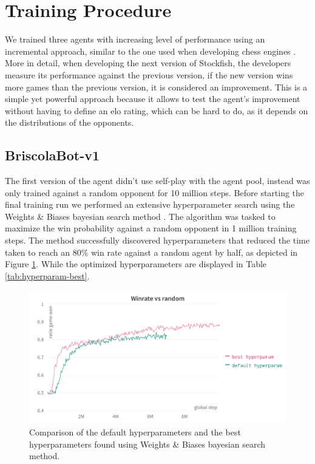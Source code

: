 \section{Training Procedure}
We trained three agents with increasing level of performance using an incremental approach, similar to the one used when developing chess engines \cite{stockfish,lc0}. More in detail, when developing the next version of Stockfish, the developers measure its performance against the previous version, if the new version wins more games than the previous version, it is considered an improvement. This is a simple yet powerful approach because it allows to test the agent's improvement without having to define an elo rating, which can be hard to do, as it depends on the distributions of the opponents.

\subsection{BriscolaBot-v1}
The first version of the agent didn't use self-play with the agent pool, instead was only trained against a random opponent for 10 million steps. Before starting the final training run we performed an extensive hyperparameter search using the Weights \& Biases bayesian search method \cite{wandb}. The algorithm was tasked to maximize the win probability against a random opponent in 1 million training steps. The method successfully discovered hyperparameters that reduced the time taken to reach an 80\% win rate against a random agent by half, as depicted in Figure \ref{fig:hyperparam-best-default}. While the optimized hyperparameters are displayed in Table \ref{tab:hyperparam-best}.

\begin{figure}[H]
    \centering
    \includegraphics[width=\textwidth]{images/hyperparam-best-default.png}
    \caption{Comparison of the default hyperparameters and the best hyperparameters found using Weights \& Biases bayesian search method.}
    \label{fig:hyperparam-best-default}
\end{figure}

